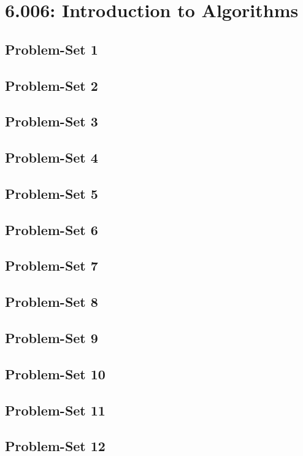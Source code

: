 \section{6.006: Introduction to Algorithms}
\subsection{Problem-Set 1}
\subsection{Problem-Set 2}
\subsection{Problem-Set 3}
\subsection{Problem-Set 4}
\subsection{Problem-Set 5}
\subsection{Problem-Set 6}
\subsection{Problem-Set 7}
\subsection{Problem-Set 8}
\subsection{Problem-Set 9}
\subsection{Problem-Set 10}
\subsection{Problem-Set 11}
\subsection{Problem-Set 12}


